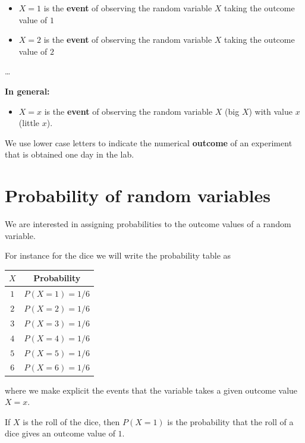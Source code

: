 \documentclass[
]{book}
\providecommand{\tightlist}{%
  \setlength{\itemsep}{0pt}\setlength{\parskip}{0pt}}
\begin{document}
\begin{itemize}
\tightlist
\item
  \(X=1\) is the \textbf{event} of observing the random variable \(X\) taking the outcome value of \(1\)
\item
  \(X=2\) is the \textbf{event} of observing the random variable \(X\) taking the outcome value of \(2\)
\end{itemize}

\ldots{}

\textbf{In general:}

\begin{itemize}
\tightlist
\item
  \(X=x\) is the \textbf{event} of observing the random variable \(X\) (big \(X\)) with value \(x\) (little \(x\)).
\end{itemize}

We use lower case letters to indicate the numerical \textbf{outcome} of an experiment that is obtained one day in the lab.

\hypertarget{probability-of-random-variables}{%
\section{Probability of random variables}\label{probability-of-random-variables}}

We are interested in assigning probabilities to the outcome values of a random variable.

For instance for the dice we will write the probability table as

\begin{longtable}[]{@{}cc@{}}
\toprule\noalign{}
\(X\) & Probability \\
\midrule\noalign{}
\endhead
\bottomrule\noalign{}
\endlastfoot
\(1\) & \(P(X=1)=1/6\) \\
\(2\) & \(P(X=2)=1/6\) \\
\(3\) & \(P(X=3)=1/6\) \\
\(4\) & \(P(X=4)=1/6\) \\
\(5\) & \(P(X=5)=1/6\) \\
\(6\) & \(P(X=6)=1/6\) \\
\end{longtable}

where we make explicit the events that the variable takes a given outcome value \(X=x\).

If \(X\) is the roll of the dice, then \(P(X=1)\) is the probability that the roll of a dice gives an outcome value of \(1\).
\end{document}
